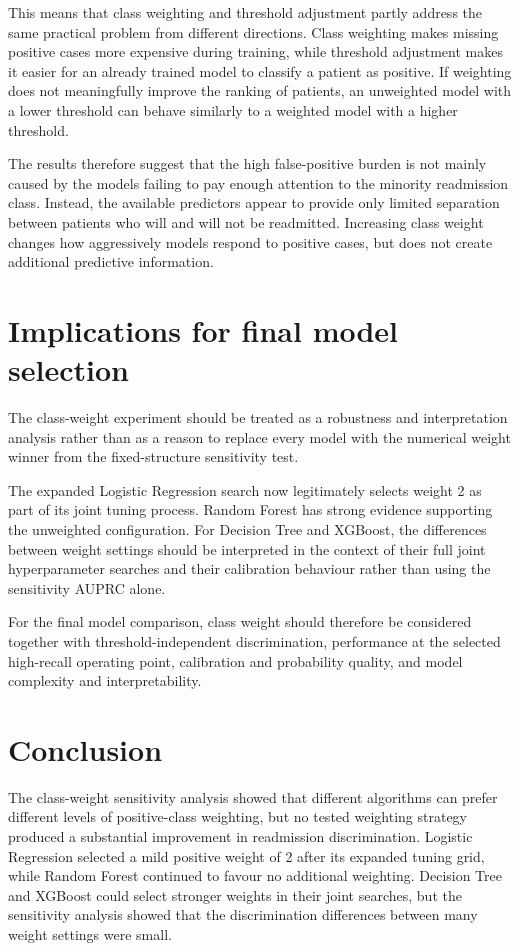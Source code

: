 \documentclass[11pt,a4paper]{article}
\begin{document}
This means that class weighting and threshold adjustment partly address the same practical problem from different directions. Class weighting makes missing positive cases more expensive during training, while threshold adjustment makes it easier for an already trained model to classify a patient as positive. If weighting does not meaningfully improve the ranking of patients, an unweighted model with a lower threshold can behave similarly to a weighted model with a higher threshold.

The results therefore suggest that the high false-positive burden is not mainly caused by the models failing to pay enough attention to the minority readmission class. Instead, the available predictors appear to provide only limited separation between patients who will and will not be readmitted. Increasing class weight changes how aggressively models respond to positive cases, but does not create additional predictive information.

\section{Implications for final model selection}

The class-weight experiment should be treated as a robustness and interpretation analysis rather than as a reason to replace every model with the numerical weight winner from the fixed-structure sensitivity test.

The expanded Logistic Regression search now legitimately selects weight 2 as part of its joint tuning process. Random Forest has strong evidence supporting the unweighted configuration. For Decision Tree and XGBoost, the differences between weight settings should be interpreted in the context of their full joint hyperparameter searches and their calibration behaviour rather than using the sensitivity AUPRC alone.

For the final model comparison, class weight should therefore be considered together with threshold-independent discrimination, performance at the selected high-recall operating point, calibration and probability quality, and model complexity and interpretability.

\section{Conclusion}

The class-weight sensitivity analysis showed that different algorithms can prefer different levels of positive-class weighting, but no tested weighting strategy produced a substantial improvement in readmission discrimination. Logistic Regression selected a mild positive weight of 2 after its expanded tuning grid, while Random Forest continued to favour no additional weighting. Decision Tree and XGBoost could select stronger weights in their joint searches, but the sensitivity analysis showed that the discrimination differences between many weight settings were small.
\end{document}

